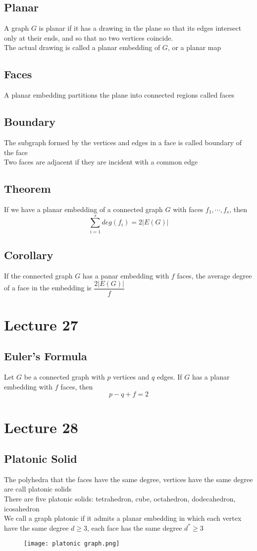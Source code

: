 \documentclass[11pt]{article}
\begin{document}
\subsection{Planar}
A graph $G$ is planar if it has a drawing in the plane so that its edges intersect only at their ends, and so that no two vertices coincide. \\
The actual drawing is called a planar embedding of $G$, or a planar map 
\subsection{Faces}
A planar embedding partitions the plane into connected regions called faces
\subsection{Boundary}
The subgraph formed by the vertices and edges in a face is called boundary of the face \\
Two faces are adjacent if they are incident with a common edge 
\subsection{Theorem}
If we have a planar embedding of a connected graph $G$ with faces $f_1,\cdots,f_s$, then 
\[\sum_{i=1}^{s}deg(f_i) = 2|E(G)|\]
\subsection{Corollary}
If the connected graph $G$ has a panar embedding with $f$ faces, the average degree of a face in the embedding is $\dfrac{2|E(G)|}{f}$

\section{Lecture 27}
\subsection{Euler's Formula}
Let $G$ be a connected graph with $p$ vertices and $q$ edges. If $G$ has a planar embedding with $f$ faces, then \[p-q+f=2\]

\section{Lecture 28}
\subsection{Platonic Solid}
The polyhedra that the faces have the same degree, vertices have the same degree are call platonic solids \\
There are five platonic solids: tetrahedron, cube, octahedron, dodecahedron, icosahedron \\
We call a graph platonic if it admits a planar embedding in which each vertex have the same degree $d\geq3$, each face has the same degree $d^*\geq3$
\begin{figure}[tbhp]
	\begin{center}
		\texttt{[image: platonic graph.png]}
	\end{center}
	\label{figcaption}
\end{figure}
\newpage
\end{document}
